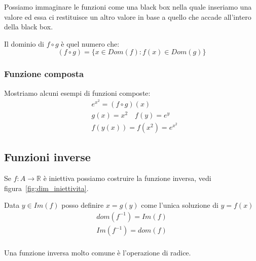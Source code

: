 \documentclass[../main.tex, class=article, 12pt]{subfiles}
\begin{document}
\begin{tcolorbox}
Possiamo immaginare le funzioni come una black box nella quale inseriamo una valore ed essa ci restituisce un altro valore in base a quello che accade all'intero della black box.
\end{tcolorbox}


Il dominio di $ f \circ g $ è quel numero che:
\begin{equation*}
        \boxed{(f \circ g) = \{ x \in Dom(f): f(x) \in Dom(g)\}}
\end{equation*}

\subsubsection{Funzione composta}\label{sec:funzione_composta}
\begin{exmp}
        Mostriamo alcuni esempi di funzioni composte:
        \begin{align*}
                & e^{x^2} = (f \circ g)(x) \\
                & g(x) = x^2 \quad f(y) = e^y \\
                & f(y(x)) = f(x^2) = e^{x^2}
        \end{align*}
\end{exmp}



\newpage
\subsection{Funzioni inverse}\label{sec:funzione_inversa}
\begin{definition}
        
Se $ f : A \to \mathbb{R} $ è iniettiva possiamo costruire la funzione inversa, vedi figura~\ref{fig:dim_iniettivita}. \par
Data $ y \in Im(f) $ posso definire $ x = g(y) $ come l'unica soluzione di $ y = f(x) $
\begin{align*}
        dom(f^{-1}) = Im(f) \\
        Im(f^{-1}) = dom(f) \\
\end{align*}
\end{definition}
Una funzione inversa molto comune è l'operazione di radice.
\end{document}
